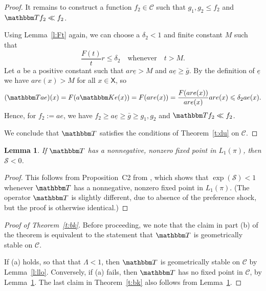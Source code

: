 \documentclass[12pt, reqno]{amsart}
\renewcommand{\leq}{\leqslant}
\renewcommand{\geq}{\geqslant}
\newcommand{\1}{\mathbbm 1}
\newcommand{\cC}{\mathscr C}
\newcommand{\sS}{\mathscr S}
\newcommand{\KK}{\mathbbm K}
\newcommand{\TT}{\mathbbm T}
\newcommand{\XX}{\mathsf X}
\theoremstyle{plain}
\newtheorem{lemma}[theorem]{Lemma}
\theoremstyle{definition}
\begin{document}
\begin{proof}
    It remains to construct a function $f_2 \in \cC$ such that 
    $g_1, g_2 \leq f_2$ and  $\TT f_2 \ll f_2$.

    Using Lemma~\ref{l:Ft} again, we can choose a $\delta_2 <1$ and
    finite constant $M$ such that
    \begin{equation}
        \frac{F(t)}{t} r \leq \delta_2
        \quad \text{whenever} \quad t > M.
    \end{equation}
    Let $a$ be a positive constant such that $a r \underline e > M$ and $a
    \underline e \geq \bar g$.  By the definition of $\underline e$ we have $a
    r e(x) > M$ for all $x \in \XX$, so
    \begin{equation}
        (\TT  a e)(x)
        = F(a \KK e (x))
        = F(a r e (x))
        = \frac{ F(a r e (x)) }{a r e (x)} a r e (x)
        \leq \delta_2 a e (x).
    \end{equation}
    Hence, for $f_2 := a e$, we have $f_2 \geq a \underline e \geq \bar g \geq
    g_1, g_2$ and $\TT  f_2 \ll f_2$.

    We conclude that $\TT $ satisfies the conditions of Theorem~\ref{t:du} on $\cC$.  
\end{proof}


\begin{lemma}
    \label{l:bkn}
    If $\TT $ has a nonnegative, nonzero fixed point in $L_1(\pi)$, then $\sS < 0$.
\end{lemma}

\begin{proof}
    This follows from Proposition~C2 from \cite{borovicka2020necessary}, which
    shows that $\exp(\sS) < 1$ whenever $\TT $ has a nonnegative, nonzero fixed
    point in $L_1(\pi)$.  (The operator $\TT $ is slightly different, due to
    absence of the preference shock, but the proof is otherwise identical.)  
\end{proof}

\begin{proof}[Proof of Theorem~\ref{t:bk}]
    Before proceeding, we note that the claim in part (b) of the theorem is
    equivalent to the statement that $\TT $ is geometrically stable on $\cC$.

    If (a) holds, so that that $\Lambda < 1$, then   $\TT $ is geometrically
    stable on $\cC$ by Lemma~\ref{l:llo}.  Conversely, if (a) fails, then $\TT $
    has no fixed point in $\cC$, by Lemma~\ref{l:bkn}.  The last claim in
    Theorem~\ref{t:bk} also follows from Lemma~\ref{l:bkn}.
\end{proof}
\end{document}
